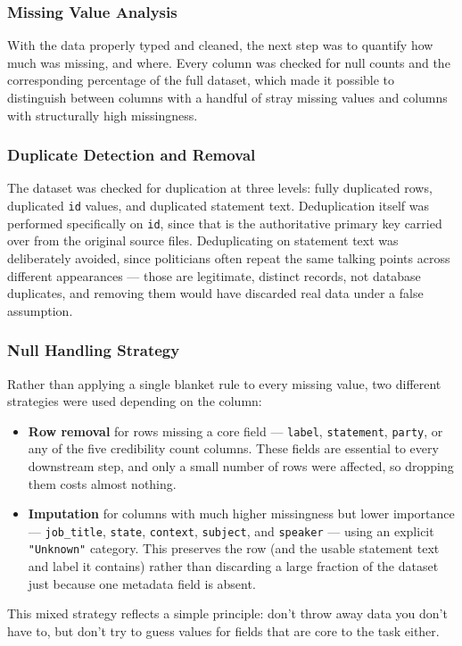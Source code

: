 \documentclass[a4paper,fleqn]{cas-sc}
\begin{document}
\subsubsection{Missing Value Analysis}
With the data properly typed and cleaned, the next step was to quantify how much was missing, and where. Every column was checked for null counts and the corresponding percentage of the full dataset, which made it possible to distinguish between columns with a handful of stray missing values and columns with structurally high missingness.

\subsubsection{Duplicate Detection and Removal}
The dataset was checked for duplication at three levels: fully duplicated rows, duplicated \texttt{id} values, and duplicated statement text. Deduplication itself was performed specifically on \texttt{id}, since that is the authoritative primary key carried over from the original source files. Deduplicating on statement text was deliberately avoided, since politicians often repeat the same talking points across different appearances — those are legitimate, distinct records, not database duplicates, and removing them would have discarded real data under a false assumption.

\subsubsection{Null Handling Strategy}
Rather than applying a single blanket rule to every missing value, two different strategies were used depending on the column:
\begin{itemize}
  \item \textbf{Row removal} for rows missing a core field — \texttt{label}, \texttt{statement}, \texttt{party}, or any of the five credibility count columns. These fields are essential to every downstream step, and only a small number of rows were affected, so dropping them costs almost nothing.
  \item \textbf{Imputation} for columns with much higher missingness but lower importance — \texttt{job\_title}, \texttt{state}, \texttt{context}, \texttt{subject}, and \texttt{speaker} — using an explicit \texttt{"Unknown"} category. This preserves the row (and the usable statement text and label it contains) rather than discarding a large fraction of the dataset just because one metadata field is absent.
\end{itemize}
This mixed strategy reflects a simple principle: don't throw away data you don't have to, but don't try to guess values for fields that are core to the task either.
\end{document}
